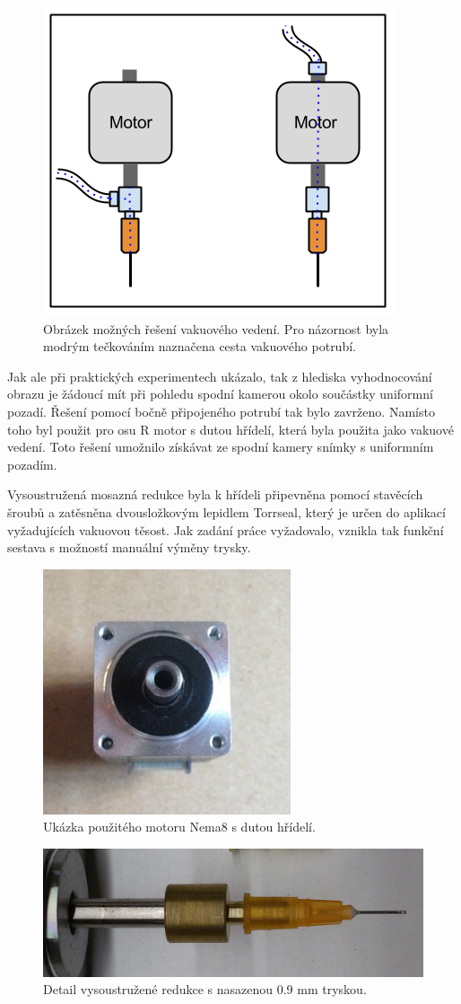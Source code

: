 \begin{figure}[h!]
  \centering
    \includegraphics[width=0.6\linewidth]{obrazky/motorR.png}%
    \caption{Obrázek možných řešení vakuového vedení. Pro názornost byla modrým tečkováním naznačena cesta vakuového potrubí.}
    \label{fig:sensor}
\end{figure}

Jak ale při praktických experimentech ukázalo, tak z hlediska vyhodnocování obrazu je žádoucí mít při pohledu spodní kamerou okolo součástky uniformní pozadí. Řešení pomocí bočně připojeného potrubí tak bylo zavrženo. 
Namísto toho byl použit pro osu R motor s dutou hřídelí, která byla použita jako vakuové vedení. Toto řešení umožnilo získávat ze spodní kamery snímky s uniformním pozadím. 

Vysoustružená mosazná redukce byla k hřídeli připevněna pomocí stavěcích šroubů a zatěsněna dvousložkovým lepidlem Torrseal, který je určen do aplikací vyžadujících vakuovou těsost.
Jak zadání práce vyžadovalo, vznikla tak funkční sestava s možností manuální výměny trysky.

\begin{figure}[h!]
  \centering
    \includegraphics[width=0.6\linewidth]{obrazky/robotdigg_nema8.jpg}%
    \caption{Ukázka použitého motoru Nema8 s dutou hřídelí.}
    \label{fig:nema8}
\end{figure}

\begin{figure}[h!]
  \centering
    \includegraphics[width=0.8\linewidth]{obrazky/tryska.jpg}%
    \caption{Detail vysoustružené redukce s nasazenou 0.9 mm tryskou.}
    \label{fig:tryska}
\end{figure}


